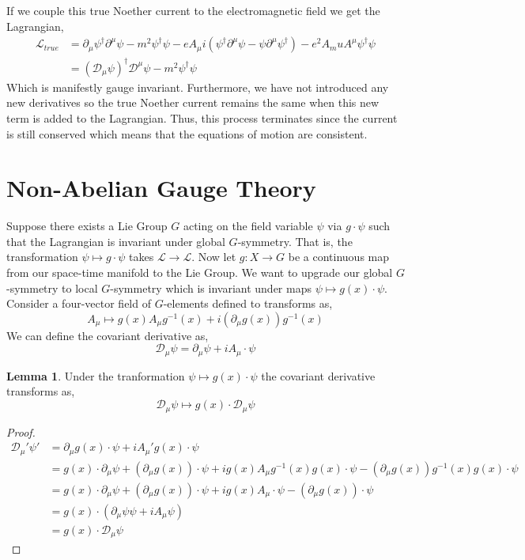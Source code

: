 \documentclass[12pt]{extarticle}
\newcommand{\lagrange}{\mathcal{L}}
\theoremstyle{definition}
\newtheorem{lemma}[theorem]{Lemma}
\begin{document}
If we couple this true Noether current to the electromagnetic field we get the Lagrangian,
\begin{align*} 
\lagrange_{true} & = \partial_\mu \psi^\dagger \partial^\mu \psi - m^2 \psi^\dagger \psi - e A_\mu i \left( \psi^\dagger \partial^\mu \psi - \psi \partial^\mu \psi^\dagger \right) - e^2 A_mu A^\mu \psi^\dagger \psi
\\
& = (\mathcal{D}_\mu \psi)^\dagger \mathcal{D}^\mu \psi - m^2 \psi^\dagger \psi
\end{align*}
Which is manifestly gauge invariant. Furthermore, we have not introduced any new derivatives so the true Noether current remains the same when this new term is added to the Lagrangian. Thus, this process terminates since the current is still conserved which means that the equations of motion are consistent. 

\section{Non-Abelian Gauge Theory}

Suppose there exists a Lie Group $G$ acting on the field variable $\psi$ via $g \cdot \psi$ such that the Lagrangian is invariant under global $G$-symmetry. That is, the transformation $\psi \mapsto g \cdot \psi$ takes $\lagrange \to \lagrange$. Now let $g : X \to G$ be a continuous map from our space-time manifold to the Lie Group. We want to upgrade our global $G$-symmetry to local $G$-symmetry which is invariant under maps $\psi \mapsto g(x) \cdot \psi$. Consider a four-vector field of $G$-elements defined to transforms as,
\[ A_\mu \mapsto g(x) A_{\mu} g^{-1}(x) + i (\partial_\mu g(x)) g^{-1}(x) \]
We can define the covariant derivative as,
\[ \mathcal{D}_\mu \psi = \partial_\mu \psi + i  A_\mu \cdot \psi \]

\begin{lemma}
Under the tranformation $\psi \mapsto g(x) \cdot \psi$ the covariant derivative transforms as,
\[ \mathcal{D}_\mu \psi \mapsto g(x) \cdot \mathcal{D}_\mu \psi\]
\end{lemma}

\begin{proof}
\begin{align*}
\mathcal{D}_\mu' \psi' & = \partial_\mu g(x) \cdot \psi + i A_\mu' g(x) \cdot \psi 
\\
& = g(x) \cdot \partial_\mu \psi + (\partial_\mu g(x)) \cdot \psi + i g(x) A_\mu g^{-1}(x) g(x) \cdot \psi - (\partial_\mu g(x))  g^{-1}(x) g(x) \cdot \psi   
\\
& = g(x) \cdot \partial_\mu \psi + (\partial_\mu g(x)) \cdot \psi + i g(x) A_\mu \cdot \psi - (\partial_\mu g(x)) \cdot \psi   
\\
& = g(x) \cdot \left(\partial_\mu \psi \psi + i A_\mu \psi \right) 
\\
& = g(x) \cdot \mathcal{D}_\mu \psi 
\end{align*}
\end{proof}
\end{document}
